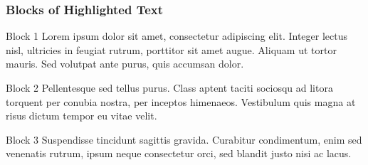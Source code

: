 
\begin{frame}
\frametitle{Blocks of Highlighted Text}
\begin{block}{Block 1}
Lorem ipsum dolor sit amet, consectetur adipiscing elit. Integer lectus nisl, ultricies in feugiat rutrum, porttitor sit amet augue. Aliquam ut tortor mauris. Sed volutpat ante purus, quis accumsan dolor.
\end{block}

\begin{block}{Block 2}
Pellentesque sed tellus purus. Class aptent taciti sociosqu ad litora torquent per conubia nostra, per inceptos himenaeos. Vestibulum quis magna at risus dictum tempor eu vitae velit.
\end{block}

\begin{block}{Block 3}
Suspendisse tincidunt sagittis gravida. Curabitur condimentum, enim sed venenatis rutrum, ipsum neque consectetur orci, sed blandit justo nisi ac lacus.
\end{block}
\end{frame}


